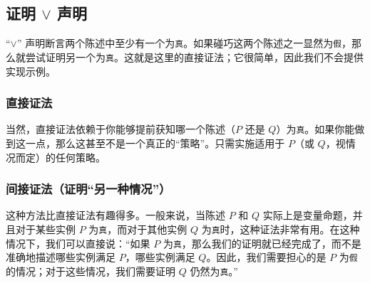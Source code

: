 

\subsection{证明 $\lor$ 声明}\label{sec:section4.9.3}

``$\lor$'' 声明断言两个陈述中至少有一个为\verb|真|。如果碰巧这两个陈述之一显然为\verb|假|，那么就尝试证明另一个为\verb|真|。这就是这里的直接证法；它很简单，因此我们不会提供实现示例。

\subsubsection*{直接证法}

\begin{center}
\noindent {}
\end{center}

当然，直接证法依赖于你能够提前获知哪一个陈述（$P$ 还是 $Q$）为\verb|真|。如果你能做到这一点，那么这甚至不是一个真正的``策略''。只需实施适用于 $P$（或 $Q$，视情况而定）的任何策略。

\subsubsection*{间接证法（证明``另一种情况''）}

这种方法比直接证法有趣得多。一般来说，当陈述 $P$ 和 $Q$ 实际上是变量命题，并且对于某些实例 $P$ 为\verb|真|，而对于其他实例 $Q$ 为\verb|真|时，这种证法非常有用。在这种情况下，我们可以直接说：``如果 $P$ 为\verb|真|，那么我们的证明就已经完成了，而不是准确地描述哪些实例满足 $P$，哪些实例满足 $Q$。因此，我们需要担心的是 $P$ 为\verb|假|的情况；对于这些情况，我们需要证明 $Q$ 仍然为\verb|真|。''

\begin{center}
    \noindent {}
\end{center}

